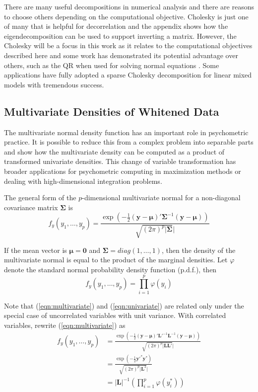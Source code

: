 \documentclass[12pt]{article}
\begin{document}
There are many useful decompositions in numerical analysis \cite{searle:1982,zhang:matrix} and there are reasons to choose others depending on the computational objective. Cholesky is just one of many that is helpful for decorrelation and the appendix shows how the eigendecomposition can be used to support inverting a matrix. However, the Cholesky will be a focus in this work as it relates to the computational objectives described here and some work has demonstrated its potential advantage over others, such as the QR when used for solving normal equations \cite{qr:chol}. Some applications have fully adopted a sparse Cholesky decomposition \cite{tim:davis} for linear mixed models \cite{bates:2004} with tremendous success.  

\subsection*{Multivariate Densities of Whitened Data}

The multivariate normal density function has an important role in psychometric practice. It is possible to reduce this from a complex problem into separable parts and show how the multivariate density can be computed as a product of transformed univariate densities. This change of variable transformation has broader applications for psychometric computing in maximization methods or dealing with high-dimensional integration problems. 

The general form of the $p$-dimensional multivariate normal for a non-diagonal covariance matrix $\bm{\Sigma}$ is
\begin{equation}
\label{eqn:multivariate}
f_y(y_1, \ldots, y_p)  =  \frac{\exp(-\frac{1}{2}(\bm{y} - \bm{\mu})'\bm{\Sigma}^{-1}(\bm{y} - \bm{\mu}))}{\sqrt{(2\pi)^p|\bm{\Sigma}}|}
\end{equation}

\noindent If the mean vector is $\bm{\mu} = \bm{0}$ and $\bm{\Sigma} = diag(1, \ldots, 1)$, then the density of the multivariate normal is equal to the product of the marginal densities. Let $\varphi$ denote the standard normal probability density function (p.d.f.), then
\begin{equation}
\label{eqn:univariate}
f_y(y_1, \ldots, y_p)  =  \prod_{i=1}^p\varphi(y_i)
\end{equation}

Note that (\ref{eqn:multivariate}) and (\ref{eqn:univariate}) are related only under the special case of uncorrelated variables with unit variance. With correlated variables, rewrite (\ref{eqn:multivariate}) as
\begin{align}
\label{eqn:multivariate2}
f_y(y_1, \ldots, y_p)  & =  \frac{\exp(-\frac{1}{2}(\bm{y} - \bm{\mu})'\bm{L}'^{-1}\bm{L}^{-1}(\bm{y} - \bm{\mu}))}{\sqrt{(2\pi)^p|\bm{L}\bm{L}'}|}\\
				&=  \frac{\exp(-\frac{1}{2}\bm{y}'^{*}\bm{y}^{*}  )}{\sqrt{(2\pi)^p|\bm{L}^2}|} \label{eqn:multivariate3.1}\\
				& =  |\bm{L}|^{-1}\left(\prod_{i=1}^p\varphi(y^*_i)\right) \label{eqn:multivariate3.2}
\end{align}
\end{document}
